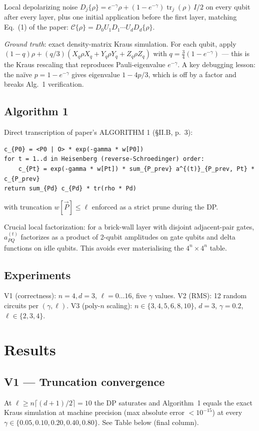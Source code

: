\documentclass[11pt]{article}
\begin{document}
Local depolarizing noise
$D_j\{\rho\}=e^{-\gamma}\rho + (1-e^{-\gamma})\operatorname{tr}_j(\rho)\,I/2$
on every qubit after every layer, plus one initial application before the first layer,
matching Eq.~(1) of the paper: $\mathcal C\{\rho\}=D_0 U_1 D_1\cdots U_d D_d\{\rho\}$.

\emph{Ground truth}: exact density-matrix Kraus simulation.  For each qubit, apply
$(1-q)\rho + (q/3)(X_q\rho X_q + Y_q\rho Y_q + Z_q\rho Z_q)$ with
$\boxed{q=\tfrac34(1-e^{-\gamma})}$ --- this is the Kraus rescaling that reproduces
Pauli-eigenvalue $e^{-\gamma}$.  A key debugging lesson: the na\"ive $p=1-e^{-\gamma}$
gives eigenvalue $1-4p/3$, which is off by a factor and breaks Alg.~1 verification.

\subsection{Algorithm 1}
Direct transcription of paper's ALGORITHM 1 (\S II.B, p.~3):
\begin{lstlisting}[basicstyle=\ttfamily\small]
c_{P0} = <P0 | O> * exp(-gamma * w[P0])
for t = 1..d in Heisenberg (reverse-Schroedinger) order:
    c_{Pt} = exp(-gamma * w[Pt]) * sum_{P_prev} a^{(t)}_{P_prev, Pt} * c_{P_prev}
return sum_{Pd} c_{Pd} * tr(rho * Pd)
\end{lstlisting}
with truncation $w[\vec P]\le\ell$ enforced as a strict prune during the DP.

Crucial local factorization: for a brick-wall layer with disjoint adjacent-pair gates,
$a^{(t)}_{PQ}$ factorizes as a product of 2-qubit amplitudes on gate qubits and delta
functions on idle qubits.  This avoids ever materialising the $4^n{\times}4^n$ table.

\subsection{Experiments}
V1 (correctness): $n{=}4,d{=}3$, $\ell{=}0\ldots16$, five $\gamma$ values.\;
V2 (RMS): 12 random circuits per $(\gamma,\ell)$.\;
V3 (poly-$n$ scaling): $n\in\{3,4,5,6,8,10\}$, $d{=}3$, $\gamma{=}0.2$, $\ell\in\{2,3,4\}$.

\section{Results}
\label{sec:results}

\subsection{V1 --- Truncation convergence}
At $\ell\ge n\lceil(d{+}1)/2\rceil{=}10$ the DP saturates and Algorithm~1 equals the
exact Kraus simulation at machine precision (max absolute error $<10^{-15}$) at every
$\gamma\in\{0.05,0.10,0.20,0.40,0.80\}$.  See Table below (final column).
\end{document}
